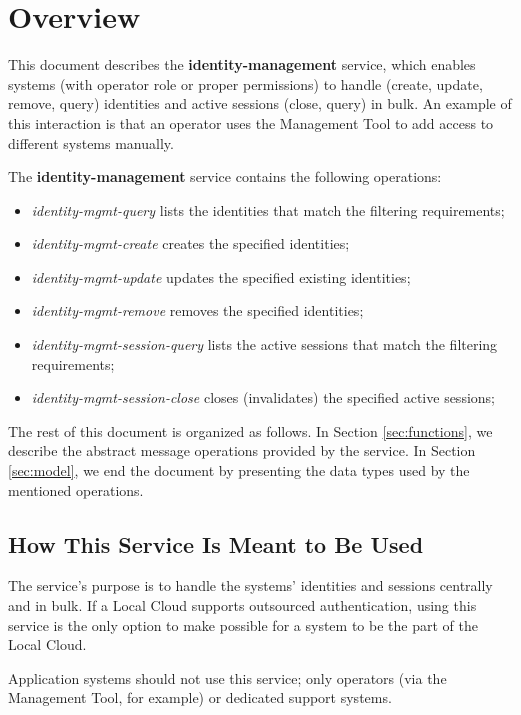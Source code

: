 \documentclass[a4paper]{arrowhead}
\begin{document}
\section{Overview}
\label{sec:overview}
This document describes the \textbf{identity-management} service, which enables systems (with operator role or proper permissions) to handle (create, update, remove, query) identities and active sessions (close, query) in bulk. An example of this interaction is that an operator uses the Management Tool to add access to different systems manually.

The \textbf{identity-management} service contains the following operations:

\begin{itemize}
    \item \textit{identity-mgmt-query} lists the identities that match the filtering requirements;
    \item \textit{identity-mgmt-create} creates the specified identities;
    \item \textit{identity-mgmt-update} updates the specified existing identities;
    \item \textit{identity-mgmt-remove} removes the specified identities;
    \item \textit{identity-mgmt-session-query} lists the active sessions that match the filtering requirements;
    \item \textit{identity-mgmt-session-close} closes (invalidates) the specified active sessions;
\end{itemize}

The rest of this document is organized as follows.
In Section \ref{sec:functions}, we describe the abstract message operations provided by the service.
In Section \ref{sec:model}, we end the document by presenting the data types used by the mentioned operations.

\subsection{How This Service Is Meant to Be Used}
The service's purpose is to handle the systems' identities and sessions centrally and in bulk. If a Local Cloud supports outsourced authentication, using this service is the only option to make possible for a system to be the part of the Local Cloud.

Application systems should not use this service; only operators (via the Management Tool, for example) or dedicated support systems.
\end{document}
